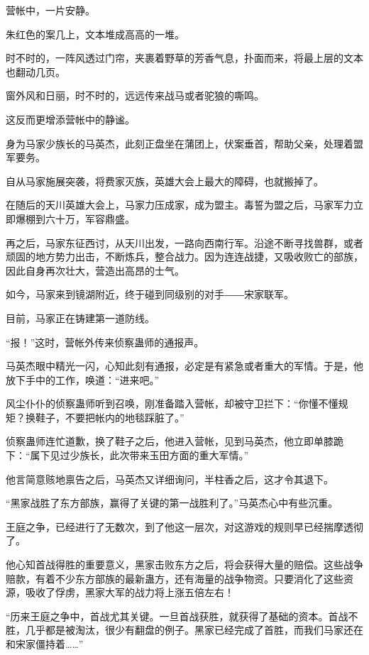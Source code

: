 
\begin{this_body}

营帐中，一片安静。

朱红色的案几上，文本堆成高高的一堆。

时不时的，一阵风透过门帘，夹裹着野草的芳香气息，扑面而来，将最上层的文本也翻动几页。

窗外风和日丽，时不时的，远远传来战马或者驼狼的嘶鸣。

这反而更增添营帐中的静谧。

身为马家少族长的马英杰，此刻正盘坐在蒲团上，伏案垂首，帮助父亲，处理着盟军要务。

自从马家施展突袭，将费家灭族，英雄大会上最大的障碍，也就搬掉了。

在随后的天川英雄大会上，马家力压成家，成为盟主。毒誓为盟之后，马家军力立即爆棚到六十万，军容鼎盛。

再之后，马家东征西讨，从天川出发，一路向西南行军。沿途不断寻找兽群，或者顽固的地方势力出击，不断炼兵，整合战力。因为连连战捷，又吸收败亡的部族，因此自身再次壮大，营造出高昂的士气。

如今，马家来到镜湖附近，终于碰到同级别的对手――宋家联军。

目前，马家正在铸建第一道防线。

“报！”这时，营帐外传来侦察蛊师的通报声。

马英杰眼中精光一闪，心知此刻有通报，必定是有紧急或者重大的军情。于是，他放下手中的工作，唤道：“进来吧。”

风尘仆仆的侦察蛊师听到召唤，刚准备踏入营帐，却被守卫拦下：“你懂不懂规矩？换鞋子，不要把帐内的地毯踩脏了。”

侦察蛊师连忙道歉，换了鞋子之后，他进入营帐，见到马英杰，他立即单膝跪下：“属下见过少族长，此次带来玉田方面的重大军情。”

他言简意赅地禀告之后，马英杰又详细询问，半柱香之后，这才令其退下。

“黑家战胜了东方部族，赢得了关键的第一战胜利了。”马英杰心中有些沉重。

王庭之争，已经进行了无数次，到了他这一层次，对这游戏的规则早已经揣摩透彻了。

他心知首战得胜的重要意义，黑家击败东方之后，将会获得大量的赔偿。这些战争赔款，有着不少东方部族的最新蛊方，还有海量的战争物资。只要消化了这些资源，吸收了俘虏，黑家大军的战力将上涨五倍左右！

“历来王庭之争中，首战尤其关键。一旦首战获胜，就获得了基础的资本。首战不胜，几乎都是被淘汰，很少有翻盘的例子。黑家已经完成了首胜，而我们马家还在和宋家僵持着……”


\end{this_body}
